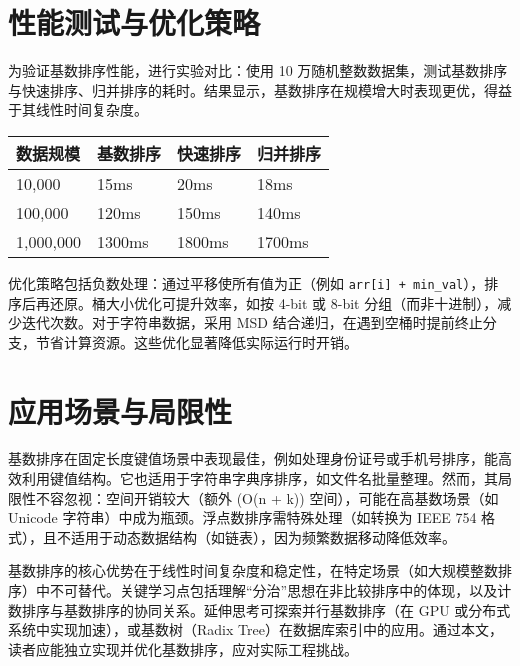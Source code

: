 \chapter{性能测试与优化策略}
为验证基数排序性能，进行实验对比：使用 10 万随机整数数据集，测试基数排序与快速排序、归并排序的耗时。结果显示，基数排序在规模增大时表现更优，得益于其线性时间复杂度。\par
\begin{table}[H]
\centering
\begin{tabular}{|l|l|l|l|}
\hline
数据规模 & 基数排序 & 快速排序 & 归并排序 \\
\hline
10,000 & 15ms & 20ms & 18ms \\
\hline
100,000 & 120ms & 150ms & 140ms \\
\hline
1,000,000 & 1300ms & 1800ms & 1700ms \\
\hline
\end{tabular}
\end{table}
优化策略包括负数处理：通过平移使所有值为正（例如 \texttt{arr[i] + min\_{}val}），排序后再还原。桶大小优化可提升效率，如按 4-bit 或 8-bit 分组（而非十进制），减少迭代次数。对于字符串数据，采用 MSD 结合递归，在遇到空桶时提前终止分支，节省计算资源。这些优化显著降低实际运行时开销。\par
\chapter{应用场景与局限性}
基数排序在固定长度键值场景中表现最佳，例如处理身份证号或手机号排序，能高效利用键值结构。它也适用于字符串字典序排序，如文件名批量整理。然而，其局限性不容忽视：空间开销较大（额外 (O(n + k)) 空间），可能在高基数场景（如 Unicode 字符串）中成为瓶颈。浮点数排序需特殊处理（如转换为 IEEE 754 格式），且不适用于动态数据结构（如链表），因为频繁数据移动降低效率。\par
基数排序的核心优势在于线性时间复杂度和稳定性，在特定场景（如大规模整数排序）中不可替代。关键学习点包括理解“分治”思想在非比较排序中的体现，以及计数排序与基数排序的协同关系。延伸思考可探索并行基数排序（在 GPU 或分布式系统中实现加速），或基数树（Radix Tree）在数据库索引中的应用。通过本文，读者应能独立实现并优化基数排序，应对实际工程挑战。\par
